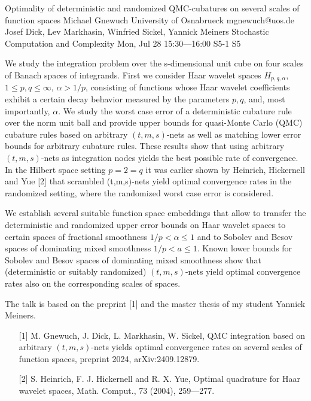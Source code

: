 \begin{talk}
  {Optimality of deterministic and randomized QMC-cubatures on several scales of function spaces}%
  {Michael Gnewuch}%
  {University of Osnabrueck}%
  {mgnewuch@uos.de}%
  {Josef Dick, Lev Markhasin, Winfried Sickel, Yannick Meiners}%
  {Stochastic Computation and Complexity}%
  {Mon, Jul 28 15:30---16:00}%
  {S5-1}%
  {S5}%
    
   
   
We study the integration problem over the s-dimensional unit cube on four scales of Banach spaces of integrands. First we consider Haar wavelet spaces $H_{p, q, \alpha}$, $1\le p, q \le \infty$, $\alpha > 1/p$, consisting of functions whose Haar wavelet coefficients exhibit a certain decay behavior measured by the parameters $p,q$, and, most importantly, $\alpha$.  We study the worst case error of a deterministic cubature rule over the norm unit ball 
and provide upper bounds for quasi-Monte Carlo (QMC) cubature rules based on arbitrary $(t,m,s)$-nets as well as matching lower error bounds for arbitrary cubature rules. These results show that using arbitrary $(t,m,s)$-nets as integration nodes yields the best possible rate of convergence. In the Hilbert space setting $p=2 = q$ it was earlier shown by Heinrich, Hickernell and Yue [2]  that scrambled (t,m,s)-nets yield optimal convergence rates in the randomized setting, where the randomized worst case error is considered. 

We establish several suitable function space embeddings that allow to transfer the deterministic and randomized upper error bounds on Haar wavelet spaces
to certain spaces of fractional smoothness $1/p < \alpha  \le 1$ and to Sobolev and Besov spaces of dominating mixed smoothness $1/p < a \le 1$.
Known lower bounds for Sobolev and Besov spaces of dominating mixed smoothness show that (deterministic or suitably randomized) $(t,m,s)$-nets yield optimal convergence rates also on the corresponding scales of spaces.   

The talk is based on the preprint [1] and the master thesis of my student Yannick Meiners.
\medskip

\begin{enumerate}
 \item[{[1]}] M. Gnewuch, J. Dick, L. Markhasin, W. Sickel, QMC integration based on arbitrary $(t,m,s)$-nets yields optimal convergence rates on several scales of function spaces, preprint 2024, arXiv:2409.12879. 
        \item[{[2]}] S. Heinrich, F. J. Hickernell and R. X. Yue, Optimal quadrature for Haar wavelet spaces, Math. Comput., 73 (2004), 259---277.
 \end{enumerate}
\end{talk}

